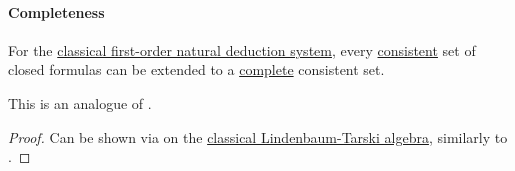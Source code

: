 \paragraph{Completeness}

\begin{lemma}\label{thm:fol_lindenbaums_lemma}
  For the \hyperref[def:fol_natural_deduction_system]{classical first-order natural deduction system}, every \hyperref[def:fol_theory/consistent]{consistent} set of closed formulas can be extended to a \hyperref[def:fol_theory/complete]{complete} consistent set.
\end{lemma}
\begin{comments}
  \item This is an analogue of .
\end{comments}
\begin{proof}
  Can be shown via  on the \hyperref[thm:lindenbaum_tarski_algebras]{classical Lindenbaum-Tarski algebra}, similarly to .
\end{proof}

